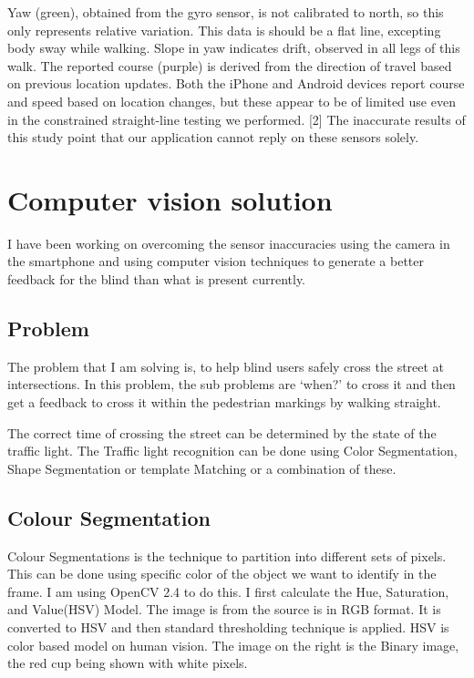 Yaw (green), obtained from the gyro sensor, is not calibrated to north, so this only represents relative variation. This data is should be a flat line, excepting body sway while walking. Slope in yaw indicates drift, observed in all legs of this walk. The reported course (purple) is derived from the direction of travel based on previous location updates. Both the iPhone and Android devices report course and speed based on location changes, but these appear to be of limited use even in the constrained straight-line testing we performed. [2] The inaccurate results of this study point that our application cannot reply on these sensors solely.


\section{Computer vision solution}
I have been working on overcoming the sensor inaccuracies using the camera in the smartphone and using computer vision techniques to generate a better feedback for the blind than what is present currently.

\subsection{Problem}
The problem that I am solving is, to help blind users safely cross the street at intersections. In this problem, the sub problems are ‘when?’ to cross it and then get a feedback to cross it within the pedestrian markings by walking straight.

The correct time of crossing the street can be determined by the state of the traffic light. The Traffic light recognition can be done using Color Segmentation, Shape Segmentation or template Matching or a combination of these. 

\subsection{Colour Segmentation}

Colour Segmentations is the technique to partition into different sets of pixels. This can be done using specific color of the object we want to identify in the frame. I am using OpenCV 2.4 to do this. I first calculate the Hue, Saturation, and Value(HSV) Model. The image is from the source is in RGB format. It is converted to HSV and then standard thresholding technique is applied. HSV is color based model on human vision. The image on the right is the Binary image, the red cup being shown with white pixels.
 
